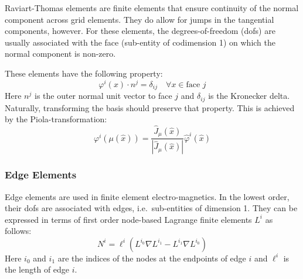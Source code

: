 \documentclass[a4paper,11pt]{article}
\begin{document}
Raviart-Thomas elements are finite elements that ensure continuity of the
normal component across grid elements.  They do allow for jumps in the
tangential components, however.  For these elements, the degrees-of-freedom
(dofs) are usually associated with the face (sub-entity of codimension 1) on
which the normal component is non-zero.


These elements have the following property:
\begin{equation}
  \varphi^i(x)\cdot n^j=\delta_{ij}\quad\forall x\in\text{face $j$}
\end{equation}
Here $n^j$ is the outer normal unit vector to face $j$ and $\delta_{ij}$ is
the Kronecker delta.  Naturally, transforming the basis should preserve that
property.  This is achieved by the Piola-transformation:
\begin{equation}
  \varphi^i(\mu(\hat x)) = \frac{\hat J_\mu(\hat x)}{|\hat J_\mu(\hat x)|}
    \hat\varphi^i(\hat x)
\end{equation}

\subsubsection{Edge Elements}

Edge elements are used in finite element electro-magnetics.  In the lowest
order, their dofs are associated with edges, i.e.\ sub-entities of dimension
1.  They can be expressed in terms of first order node-based Lagrange finite
elements $L^i$ as follows:
\begin{equation}
  N^i = \ell^i(L^{i_0} \nabla L^{i_1} - L^{i_1} \nabla L^{i_0})
\end{equation}
Here $i_0$ and $i_1$ are the indices of the nodes at the endpoints of edge $i$ and
$\ell^i$ is the length of edge $i$.

\end{document}
